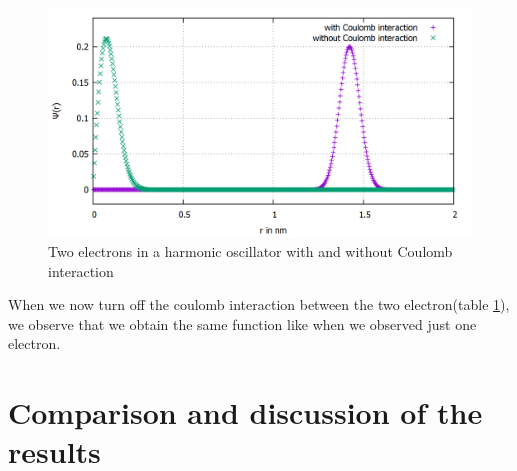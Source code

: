 \documentclass[10pt,a4paper]{article}
\begin{document}
\begin{figure}[h]
	\includegraphics[scale = 0.25]{k1_comparison_2El_n500.png}
	\centering
	\caption{Two electrons in a harmonic oscillator with and without Coulomb interaction}
	\label{plot2elrcoulomb}
\end{figure}

When we now turn off the coulomb interaction between the two electron(table \ref{plot2elrcoulomb}), we observe that we obtain the same function like when we observed just one electron.









\section{Comparison and discussion of the results} \label{Comparison and results}
\end{document}
